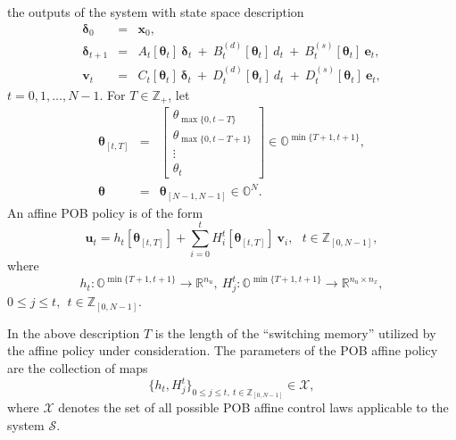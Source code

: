 \documentclass[letterpaper,11pt]{article}
\newcommand{\AR}[2]{\left[\begin{array}{#1}#2\end{array}\right]}
\begin{document}
the outputs of the system with state space description
\begin{eqnarray}
\label{model_pure}
\nonumber
\bm{\delta}_0 & = & \mathbf{x}_0,\\
\nonumber
\bm{\delta}_{t+1} & = & A_t[\bm{\theta}_t] ~ \bm{\delta}_t ~ + ~ B_t^{(d)}[\bm{\theta}_t] ~ d_t ~ + ~ B_t^{(s)}[\bm{\theta}_t] ~ \mathbf{e}_t,   \\
\mathbf{v}_t  & = & C_t[\bm{\theta}_t] ~ \bm{\delta}_t  ~ + ~ D_t^{(d)}[\bm{\theta}_t] ~ d_t ~ + ~ D_t^{(s)}[\bm{\theta}_t] ~ \mathbf{e}_t,  
\end{eqnarray}
$t=0,1, \hdots, N-1$. For $T \in \mathbb{Z}_+$, let 
\begin{eqnarray*}
\bm{\theta}_{[t,T]} & = &
\AR{c}{\theta_{\max{\{ 0,t-T \}}} \\ \theta_{\max{\{ 0,t-T+1 \}}} \\  \vdots  	\\ \theta_t}  \in 
\mathbb{O}^{\min{\{T+1,t+1\}}}, \\
\bm{\theta} &=&  \bm{\theta}_{[N-1,N-1]} \in \mathbb{O}^N.
\end{eqnarray*}
An affine POB policy is of the form
\begin{equation}
\label{control_pure_out}
\mathbf{u}_t = h_{t}[\bm{\theta}_{[t,T]}] + \sum_{i=0}^t
H_i^t[\bm{\theta}_{[t,T]}]~ \mathbf{v}_i,~~
~t \in  \mathbb{Z}_{[0,N-1]},
\end{equation}
where
\begin{equation}
\label{parameters_control}
h_{t} :  \mathbb{O}^{\min{\{T+1,t+1\}}}  \rightarrow \mathbb{R}^{n_u},~ H_j^t :    \mathbb{O}^{\min{\{T+1,t+1\}}} \rightarrow \mathbb{R}^{n_u \times n_x},
\end{equation}
$0 \leq j \leq t, ~~ t \in \mathbb{Z}_{[0,N-1]}$. 

In the above description $T$ is the length of the ``switching memory''  utilized by the affine policy under consideration. 
The parameters of the POB affine policy are the collection of maps
$$ \{ h_{t}, H_j^t \}_{0 \leq j \leq t, ~ t \in \mathbb{Z}_{[0,N-1]}} \in \mathcal{X},
$$ 
where
$ \mathcal{X}$ denotes the set of all possible POB affine control laws 
applicable to the system $\mathcal{S}$.
\end{document}
